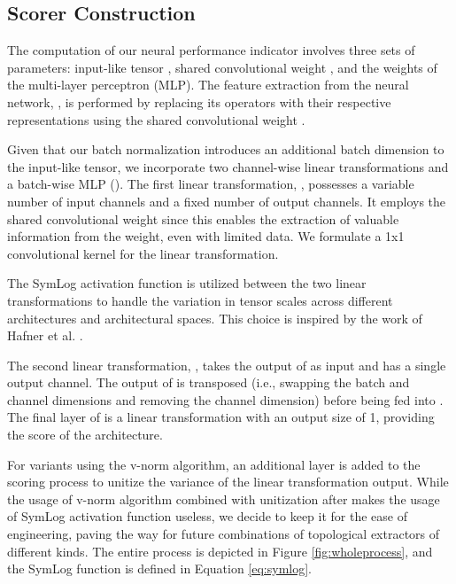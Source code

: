 \documentclass[lettersize,journal]{IEEEtran}
\begin{document}
    \subsection{Scorer Construction} \label{sec:scorer}

        The computation of our neural performance indicator involves three sets of parameters: input-like tensor , shared convolutional weight , and the weights of the multi-layer perceptron (MLP). The feature extraction from the neural network, , is performed by replacing its operators with their respective representations using the shared convolutional weight .
        
        Given that our batch normalization introduces an additional batch dimension to the input-like tensor, we incorporate two channel-wise linear transformations and a batch-wise MLP (). The first linear transformation, , possesses a variable number of input channels and a fixed number of output channels. It employs the shared convolutional weight since this enables the extraction of valuable information from the weight, even with limited data. We formulate a 1x1 convolutional kernel for the  linear transformation.
        
        The SymLog activation function is utilized between the two linear transformations to handle the variation in tensor scales across different architectures and architectural spaces. This choice is inspired by the work of  Hafner et al. \cite{hafner2023dreamerv3}.
        
        The second linear transformation, , takes the output of  as input and has a single output channel. The output of  is transposed (i.e., swapping the batch and channel dimensions and removing the channel dimension) before being fed into . The final layer of  is a linear transformation with an output size of 1, providing the score of the architecture.
        
        For variants using the v-norm algorithm, an additional layer is added to the scoring process to unitize the variance of the  linear transformation output. While the usage of v-norm algorithm combined with unitization after  makes the usage of SymLog activation function useless, we decide to keep it for the ease of engineering, paving the way for future combinations of topological extractors of different kinds. The entire process is depicted in Figure \ref{fig:wholeprocess}, and the SymLog function is defined in Equation \ref{eq:symlog}.
        
        
\end{document}
